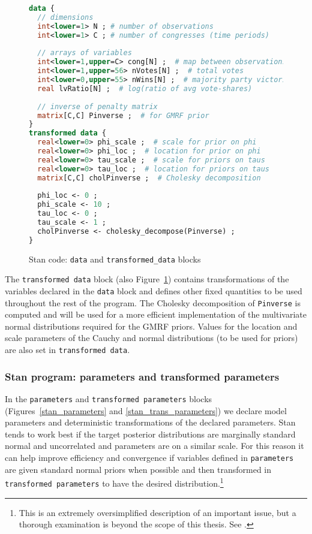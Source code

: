 \begin{figure}[h]
\begin{lstlisting}[language=Stan, frame=trBL]
data {
  // dimensions 
  int<lower=1> N ; # number of observations 
  int<lower=1> C ; # number of congresses (time periods)
  
  // arrays of variables 
  int<lower=1,upper=C> cong[N] ;  # map between observations & congresses
  int<lower=1,upper=56> nVotes[N] ;  # total votes
  int<lower=0,upper=55> nWins[N] ;  # majority party victories
  real lvRatio[N] ;  # log(ratio of avg vote-shares)
  
  // inverse of penalty matrix 
  matrix[C,C] Pinverse ;  # for GMRF prior
}
transformed data {
  real<lower=0> phi_scale ;  # scale for prior on phi
  real<lower=0> phi_loc ;  # location for prior on phi
  real<lower=0> tau_scale ;  # scale for priors on taus
  real<lower=0> tau_loc ;  # location for priors on taus
  matrix[C,C] cholPinverse ;  # Cholesky decomposition 
  
  phi_loc <- 0 ;
  phi_scale <- 10 ;
  tau_loc <- 0 ;
  tau_scale <- 1 ;
  cholPinverse <- cholesky_decompose(Pinverse) ;
}
\end{lstlisting}
\caption{Stan code: {\tt data} and {\tt transformed\_data} blocks}
\label{stan_data}
\end{figure}



The {\tt transformed data} block (also Figure~\ref{stan_data}) contains transformations of the 
variables declared in the {\tt data} block and defines other fixed quantities to be used throughout 
the rest of the program. The Cholesky decomposition of {\tt Pinverse} is computed and will be used 
for a more efficient implementation of the multivariate normal distributions required for the GMRF 
priors. Values for the location and scale parameters of the Cauchy and normal distributions 
(to be used for priors) are also set in {\tt transformed data}. 


\subsubsection{Stan program: parameters and transformed parameters}

In the {\tt parameters} and {\tt transformed parameters} blocks (Figures~\ref{stan_parameters} 
and \ref{stan_trans_parameters}) we declare model parameters and deterministic transformations 
of the declared parameters. Stan tends to work best if the target posterior distributions are marginally 
standard normal and uncorrelated and parameters are on a similar scale. For this reason it can help 
improve efficiency and convergence if variables defined in {\tt parameters} are given standard normal 
priors when possible and then transformed in {\tt transformed parameters} to have the desired 
distribution.\footnote{This is an extremely oversimplified description of an important issue, but 
a thorough examination is beyond the scope of this thesis. 
See .} 

